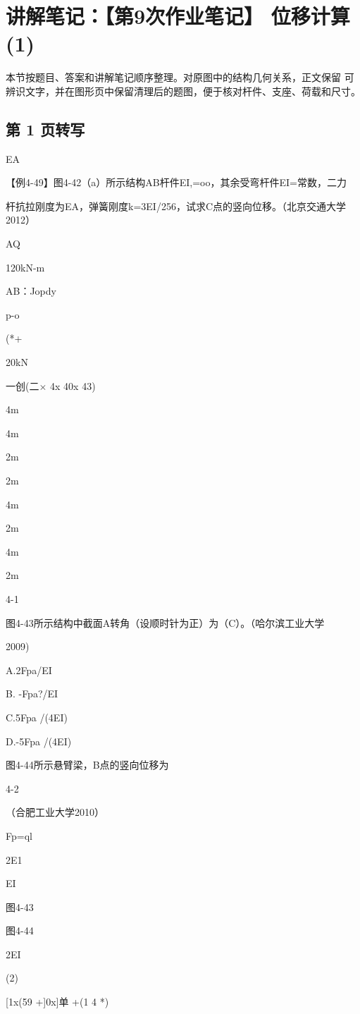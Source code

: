 \section{讲解笔记：【第9次作业笔记】 位移计算(1)}
\begin{analysisbox}
本节按题目、答案和讲解笔记顺序整理。对原图中的结构几何关系，正文保留 可辨识文字，并在图形页中保留清理后的题图，便于核对杆件、支座、荷载和尺寸。
\end{analysisbox}
\subsection*{第 1 页转写}
EA

【例4-49】图4-42（a）所示结构AB杆件EI,=oo，其余受弯杆件EI=常数，二力

杆抗拉刚度为EA，弹簧刚度k=3EI/256，试求C点的竖向位移。（北京交通大学2012）

AQ

120kN-m

AB：Jopdy

p-o

(*+

20kN

一创(二$\times$ 4x 40x 43)

4m

4m

2m

2m

4m

2m

4m

2m

4-1

图4-43所示结构中截面A转角（设顺时针为正）为（C）。（哈尔滨工业大学

2009)

A.2Fpa/EI

B. -Fpa?/EI

C.5Fpa /(4EI)

D.-5Fpa /(4EI)

图4-44所示悬臂梁，B点的竖向位移为

4-2

（合肥工业大学2010）

Fp=ql

2E1

EI

图4-43

图4-44

2EI

(2)

[1x(59 +]0x]单 +(1 4 *)

